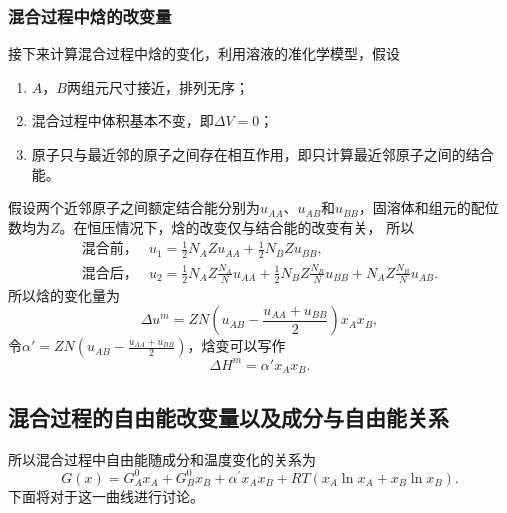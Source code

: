                 \subsubsection{混合过程中焓的改变量}
                    接下来计算混合过程中焓的变化，利用溶液的准化学模型，假设
                    \begin{enumerate}
                        \item $A$，$B$两组元尺寸接近，排列无序；
                        \item 混合过程中体积基本不变，即$\Delta V=0$；
                        \item 原子只与最近邻的原子之间存在相互作用，即只计算最近邻原子之间的结合能。
                    \end{enumerate}
                    假设两个近邻原子之间额定结合能分别为$u_{AA}$、$u_{AB}$和$u_{BB}$，固溶体和组元的配位数均为$Z$。在恒压情况下，焓的改变仅与结合能的改变有关，
                    所以
                    \begin{align}
                        \text{混合前，}&u_{1}=\frac{1}{2} N_{A} Z u_{A A}+\frac{1}{2} N_{B} Z u_{B B},\\
                        \text{混合后，}&u_{2}=\frac{1}{2} N_{A} Z \frac{N_{A}}{N} u_{A A}+\frac{1}{2} N_{B} Z \frac{N_{B}}{N} u_{B B}+N_{A} Z \frac{N_{B}}{N} u_{A B}.
                    \end{align}
                    所以焓的变化量为
                    \begin{equation}
                        \Delta u^m=Z N\left(u_{A B}-\frac{u_{A A}+u_{B B}}{2}\right) x_{A} x_{B},
                    \end{equation}
                    令$\alpha'=ZN\left( u_{AB}-\frac{u_{AA}+u_{BB}}{2} \right)$，焓变可以写作
                    \begin{equation}
                        \Delta H^m=\alpha'x_Ax_B.
                    \end{equation}
            \subsection{混合过程的自由能改变量以及成分与自由能关系}
                所以混合过程中自由能随成分和温度变化的关系为
                \begin{equation}
                    G(x)=G_{A}^{0} x_{A}+G_{B}^{0} x_{B}+\alpha^{\prime} x_{A} x_{B}+R T\left(x_{A} \ln x_{A}+x_{B} \ln x_{B}\right)\label{混合过程的自由能曲线}.
                \end{equation}
                下面将对于这一曲线进行讨论。

